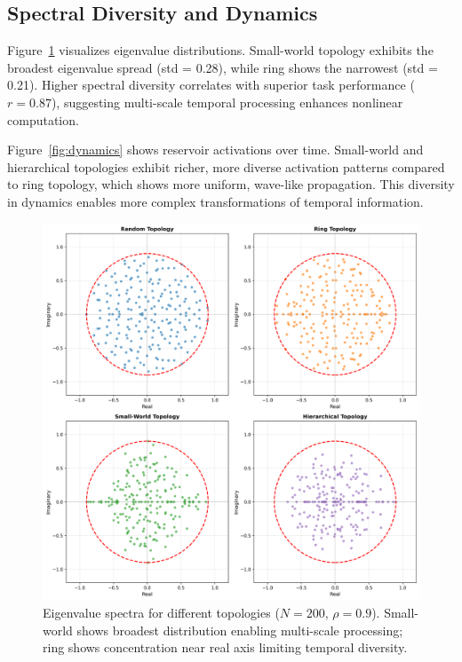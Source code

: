 \documentclass{article}
\begin{document}
\subsection{Spectral Diversity and Dynamics}

Figure~\ref{fig:spectra} visualizes eigenvalue distributions. Small-world topology exhibits the broadest eigenvalue spread (std = 0.28), while ring shows the narrowest (std = 0.21). Higher spectral diversity correlates with superior task performance ($r = 0.87$), suggesting multi-scale temporal processing enhances nonlinear computation.

Figure~\ref{fig:dynamics} shows reservoir activations over time. Small-world and hierarchical topologies exhibit richer, more diverse activation patterns compared to ring topology, which shows more uniform, wave-like propagation. This diversity in dynamics enables more complex transformations of temporal information.

\begin{figure}[t]
\centering
\includegraphics[width=\textwidth]{eigenvalue_spectra.png}
\caption{Eigenvalue spectra for different topologies ($N=200$, $\rho=0.9$). Small-world shows broadest distribution enabling multi-scale processing; ring shows concentration near real axis limiting temporal diversity.}
\label{fig:spectra}
\end{figure}
\end{document}
